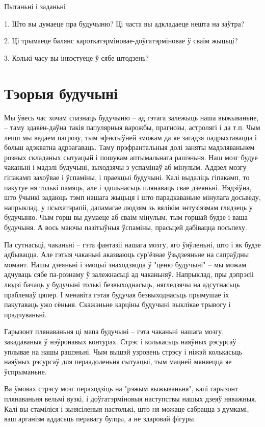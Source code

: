 Пытаньні і заданьні

1. Што вы думаеце пра будучыню? Ці часта вы адкладаеце нешта на заўтра?

2. Ці трымаеце балянс кароткатэрміновае-доўгатэрміновае ў сваім жыцьці?

3. Колькі часу вы інвэстуеце ў сябе штодзень?


\section{Тэорыя будучыні}

Мы ўвесь час хочам спазнаць будучыню – ад гэтага залежыць наша выжываньне, – таму здавён-даўна такія папулярныя варожбы, прагнозы, астролягі і да т.п. Чым лепш мы ведаем пагрозу, тым эфэктыўней зможам да яе загадзя падрыхтавацца і больш адэкватна адрэагаваць. Таму прэфрантальныя долі заняты мадэляваньнем розных складаных сытуацый і пошукам аптымальнага рашэньня. Наш мозг будуе чаканьні і мадэлі будучыні, зыходзячы з успамінаў аб мінулым. Аддзел мозгу гіпакамп захоўвае і ўспаміны, і праекцыі будучыні. Калі выдаліць гіпакамп, то пакутуе ня толькі памяць, але і здольнасьць плянаваць свае дзеяньні. Нядзіўна, што ўчынкі задаюць тэмп нашага жыцьця і што парадкаваньне мінулага досьведу, напрыклад, у псыхатэрапіі, дапамагае людзям зь вялікім энтузіязмам глядзець у будучыню. Чым горш вы думаеце аб сваім мінулым, тым горшай будзе і ваша будучыня. А вось маючы пазітыўныя ўспаміны, прасьцей дабівацца посьпеху.

Па сутнасьці, чаканьні – гэта фантазіі нашага мозгу, яго ўяўленьні, што і як будзе адбывацца. Але гэтыя чаканьні аказваюць сур'ёзнае ўзьдзеяньне на сапраўдны момант. Нашы дзеяньні і эмоцыі знаходзяцца ў "ценю будучыні" – мы можам адчуваць сябе па-рознаму ў залежнасьці ад чаканьняў. Напрыклад, пры дэпрэсіі людзі бачаць у будучыні толькі безвыходнасьць, нягледзячы на адсутнасьць праблемаў цяпер. І менавіта гэтая будучая безвыходнасьць прымушае іх пакутаваць ужо сёньня. Скажэньне карціны будучыні выклікае трывогу і прадчуваньні.

Гарызонт плянаваньня ці мапа будучыні – гэта чаканьні нашага мозгу, закадаваныя ў нэўронавых контурах. Стрэс і колькасьць наяўных рэсурсаў уплывае на нашы рашэньні. Чым вышэй узровень стрэсу і ніжэй колькасьць наяўных рэсурсаў для пераадоленьня сытуацыі, тым мацней мяняецца яе ўспрыманьне.

Ва ўмовах стрэсу мозг пераходзіць на "рэжым выжываньня", калі гарызонт плянаваньня вельмі вузкі, і доўгатэрміновыя наступствы нашых дзеяў няважныя. Калі вы стаміліся і зьнясіленыя настолькі, што ня можаце сабрацца з думкамі, ваш арганізм аддасьць перавагу булцы, а не здаровай фігуры.


